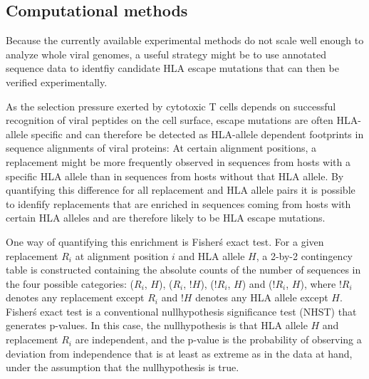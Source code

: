 \documentclass[fleqn,11pt]{SelfArx} %
\begin{document}
\subsection{Computational methods}

Because the currently available experimental methods do not scale well enough to analyze
whole viral genomes, a useful strategy might be to use annotated sequence data to identfiy 
candidate HLA escape mutations that can then be verified experimentally.

As the selection pressure exerted by cytotoxic T cells depends on successful recognition
of viral peptides on the cell surface, escape mutations are often HLA-allele specific
and can therefore  be detected as HLA-allele dependent footprints in sequence
alignments of viral proteins: At certain alignment positions, a replacement
might be more frequently observed in sequences from hosts with a specific HLA allele than in 
sequences from hosts without that HLA allele. By quantifying this difference
for all replacement and HLA allele pairs it is possible to idenfify replacements that
are enriched in sequences coming from hosts with certain HLA alleles and are therefore
likely to be HLA escape mutations.

One way of quantifying this enrichment is Fisher\'s exact test.
For a given replacement \(R_{i}\) at alignment position \(i\) and HLA allele \(H\),
a 2-by-2 contingency table is constructed containing the absolute counts of the
number of sequences in the four possible categories: 
(\(R_{i}\), \(H\)), (\(R_{i}\), \(!H\)), (\(!R_{i}\), \(H\)) and (\(!R_{i}\), \(H\)),
where \(!R_{i}\) denotes any replacement except \(R_{i}\) and \(!H\) denotes any HLA allele
except \(H\).
Fisher\'s exact test is a conventional nullhypothesis significance test (NHST) that
generates p-values. In this case, the nullhypothesis is that HLA allele \(H\) and 
replacement \(R_{i}\) are independent, and the p-value is the probability of
observing a deviation from independence that is at least as extreme as in the data at hand,
under the assumption that the nullhypothesis is true.
\end{document}
